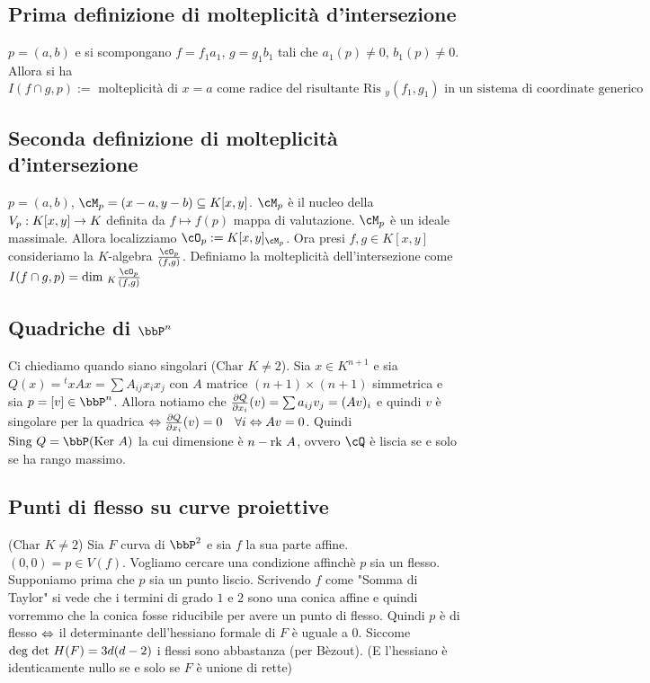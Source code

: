 \documentclass[a4paper,NoNotes,GeneralMath]{stdmdoc}
\newcommand{\Char}{\text{Char }}
\newcommand{\Sing}{\text{Sing }}
\begin{document}
	\subsection*{Prima definizione di molteplicità d'intersezione}
	$p = (a,b)$ e si scompongano $f = f_1 a_1$, $g = g_1 b_1$ tali che $a_1 (p) \neq 0$, $b_1 (p) \neq 0$. Allora si ha $I(f \cap g, p) := \text{ molteplicità di } x = a \text{ come radice del risultante } \text{Ris }_y(f_1, g_1) \text{ in un sistema di coordinate generico }$
	
	\subsection*{Seconda definizione di molteplicità d'intersezione}
	$p = (a,b)$, $\cM_p = (x-a, y-b) \subseteq K[x,y]$. $\cM_p$ è il nucleo della $V_p: K[x,y] \rightarrow K$ definita da $f \mapsto f(p)$ mappa di valutazione. $\cM_p$ è un ideale massimale. Allora localizziamo $\cO_p := K[x,y]_{\cM_p}$. Ora presi $f, g \in K[x,y]$ consideriamo la $K$-algebra $\frac{\cO_p}{(f,g)}$. Definiamo la molteplicità dell'intersezione come $I(f\cap g, p) = \Dim_K \frac{\cO_p}{(f,g)}$
	
	\subsection*{Quadriche di $\bbP^n$}
	Ci chiediamo quando siano singolari ($\Char K \neq 2$). Sia $x \in K^{n+1}$ e sia $Q(x) = {}^txAx = \sum A_{ij}x_ix_j$ con $A$ matrice $(n+1)\times (n+1)$ simmetrica e sia $p = [v] \in \bbP^n$. Allora notiamo che $\dpar{Q}{x_i}(v) = \sum a_{ij} v_j = (Av)_i$ e quindi $v$ è singolare per la quadrica $\sse \dpar{Q}{x_i}(v) = 0 \quad \forall i \sse Av = 0$. Quindi $\Sing Q = \bbP (\Ker A)$ la cui dimensione è $n - \mbox{rk } A$, ovvero $\cQ$ è liscia se e solo se ha rango massimo.
	
	\subsection*{Punti di flesso su curve proiettive}
	($\Char K \neq 2$) Sia $F$ curva di $\bbP^2$ e sia $f$ la sua parte affine. $(0,0) = p \in V(f)$. Vogliamo cercare una condizione affinchè $p$ sia un flesso. Supponiamo prima che $p$ sia un punto liscio. Scrivendo $f$ come "Somma di Taylor" si vede che i termini di grado $1$ e $2$ sono una conica affine e quindi vorremmo che la conica fosse riducibile per avere un punto di flesso. Quindi $p$ è di flesso $\Leftrightarrow$ il determinante dell'hessiano formale di $F$ è uguale a $0$. Siccome $\mbox{deg } \mbox{det } H(F) = 3d(d-2)$ i flessi sono abbastanza (per Bèzout). (E l'hessiano è identicamente nullo se e solo se $F$ è unione di rette)
\end{document}
